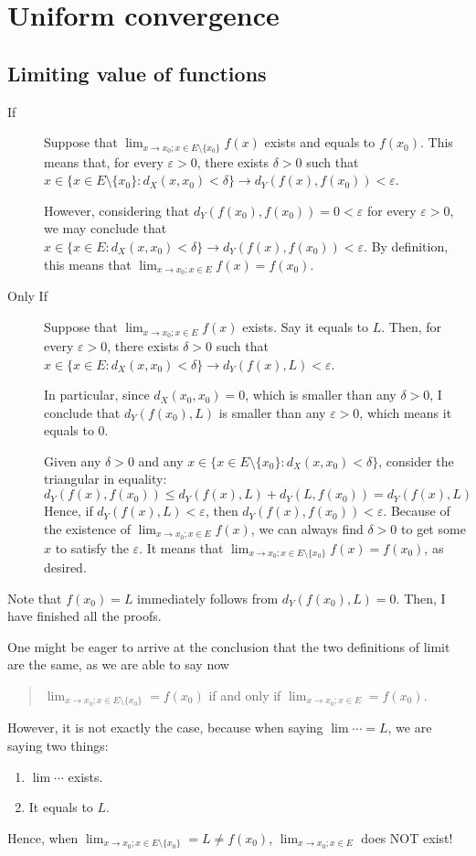 \section{Uniform convergence}
\subsection{Limiting value of functions}
\begin{description}
	\item[If] Suppose that $\lim_{x\to x_0;x\in E\setminus\{x_0\}} f(x)$ exists and equals to $f(x_0)$. This means that, for every $\varepsilon > 0$, there exists $\delta > 0$ such that $x \in \{x \in E\setminus\{x_0\} : d_X(x,x_0) < \delta\} \to d_Y(f(x),f(x_0)) < \varepsilon$.
	
	However, considering that $d_Y(f(x_0),f(x_0)) = 0 < \varepsilon$ for every $\varepsilon > 0$, we may conclude that $x \in \{x \in E : d_X(x,x_0) < \delta\} \to d_Y(f(x),f(x_0)) < \varepsilon$. By definition, this means that $\lim_{x\to x_0;x\in E} f(x) = f(x_0)$.
	
	\item[Only If] Suppose that $\lim_{x\to x_0;x\in E} f(x)$ exists. Say it equals to $L$. Then, for every $\varepsilon > 0$, there exists $\delta > 0$ such that $x \in \{x \in E : d_X(x,x_0) < \delta\} \to d_Y(f(x),L) < \varepsilon$. 
	
	In particular, since $d_X(x_0,x_0) = 0$, which is smaller than any $\delta > 0$, I conclude that $d_Y(f(x_0), L)$ is smaller than any $\varepsilon > 0$, which means it equals to $0$.
	
	Given any $\delta > 0$ and any $x \in \{x \in E\setminus\{x_0\} : d_X(x,x_0) < \delta\}$, consider the triangular in equality:
	$$
	d_Y(f(x),f(x_0)) \le d_Y(f(x),L) + d_Y(L, f(x_0)) = d_Y(f(x),L)
	$$
	Hence, if $d_Y(f(x),L) < \varepsilon$, then $d_Y(f(x),f(x_0)) < \varepsilon$. Because of the existence of $\lim_{x\to x_0;x\in E} f(x)$, we can always find $\delta > 0$ to get some $x$ to satisfy the $\varepsilon$. It means that $\lim_{x\to x_0;x\in E\setminus\{x_0\}} f(x) = f(x_0)$, as desired.
\end{description}

Note that $f(x_0) = L$ immediately follows from $d_Y(f(x_0),L) = 0$. Then, I have finished all the proofs.

One might be eager to arrive at the conclusion that the two definitions of limit are the same, as we are able to say now
\begin{quotation}
	$\lim_{x\to x_0;x\in E\setminus\{x_0\}} = f(x_0)$ if and only if $\lim_{x\to x_0;x\in E} = f(x_0)$.
\end{quotation}
However, it is not exactly the case, because when saying $\lim \cdots = L$, we are saying two things:
\begin{enumerate}
	\item $\lim \cdots$ exists.
	\item It equals to $L$.
\end{enumerate}
Hence, when $\lim_{x\to x_0;x\in E\setminus\{x_0\}} = L \ne f(x_0)$, $\lim_{x\to x_0;x\in E}$ does NOT exist!